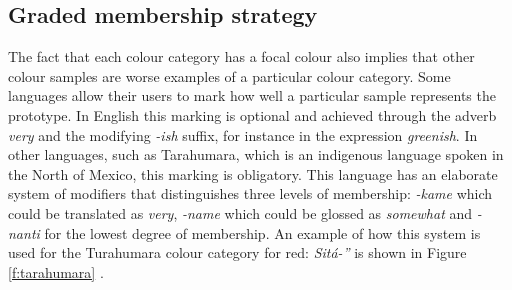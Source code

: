 \subsection{Graded membership strategy}

The fact that each colour category has a focal colour also
implies that other colour samples are worse examples of a particular
colour category. Some languages allow their users to mark how well a
particular sample represents the prototype. In English this marking is
optional and achieved through the adverb \textit{very} and the modifying
\textit{-ish} suffix, for instance in the expression \textit{greenish}. In other
languages, such as Tarahumara, which is an indigenous language spoken
in the North of Mexico, this marking is obligatory. This language has
an elaborate system of modifiers that distinguishes three levels of
membership: \textit{-kame} which could be translated as \textit{very}, \textit{-name}
which could be glossed as \textit{somewhat} and \textit{-nanti} for the lowest
degree of membership. An example of how this system is used for the
Turahumara colour category for red: \textit{Sit\'a-''} is shown in Figure
\ref{f:tarahumara} \citep{burgress83tarahumara}.

